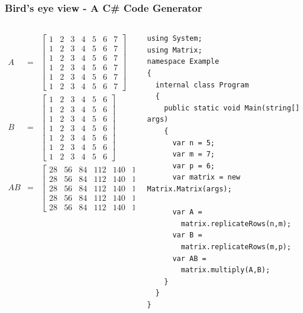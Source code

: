 \documentclass[10pt, compress, usenames, dvipsnames]{beamer}
\begin{document}
\begin{frame}[fragile]
\frametitle{Bird's eye view - A C\# Code Generator}
  
\begin{columns}[T] %
\begin{column}{.48\textwidth}
  {\scriptsize
  \begin{align*}
    A &=& \begin{bmatrix}
      1 & 2 & 3 & 4 & 5 & 6 & 7 \\
      1 & 2 & 3 & 4 & 5 & 6 & 7 \\
      1 & 2 & 3 & 4 & 5 & 6 & 7 \\
      1 & 2 & 3 & 4 & 5 & 6 & 7 \\
      1 & 2 & 3 & 4 & 5 & 6 & 7 \\
      1 & 2 & 3 & 4 & 5 & 6 & 7
        \end{bmatrix} \\
    B &=& \begin{bmatrix}
      1 & 2 & 3 & 4 & 5 & 6 \\
      1 & 2 & 3 & 4 & 5 & 6 \\
      1 & 2 & 3 & 4 & 5 & 6 \\
      1 & 2 & 3 & 4 & 5 & 6 \\
      1 & 2 & 3 & 4 & 5 & 6 \\
      1 & 2 & 3 & 4 & 5 & 6 \\
      1 & 2 & 3 & 4 & 5 & 6
        \end{bmatrix} \\
    AB &=&
           \begin{bmatrix}
28 & 56 & 84 & 112 & 140 & 168 \\
28 & 56 & 84 & 112 & 140 & 168 \\
28 & 56 & 84 & 112 & 140 & 168 \\
28 & 56 & 84 & 112 & 140 & 168 \\
28 & 56 & 84 & 112 & 140 & 168
           \end{bmatrix}
  \end{align*}
  }%
\end{column}%
\hfill%
\pause
\begin{column}{.48\textwidth}
\begin{verbatim}
using System;
using Matrix;
namespace Example
{
  internal class Program
  {
    public static void Main(string[] args)
    {
      var n = 5;
      var m = 7;
      var p = 6;
      var matrix = new Matrix.Matrix(args);

      var A = 
        matrix.replicateRows(n,m);
      var B = 
        matrix.replicateRows(m,p);
      var AB = 
        matrix.multiply(A,B);
    }
  }
}
\end{verbatim}
\end{column}%
\end{columns}
\end{frame}
\end{document}

